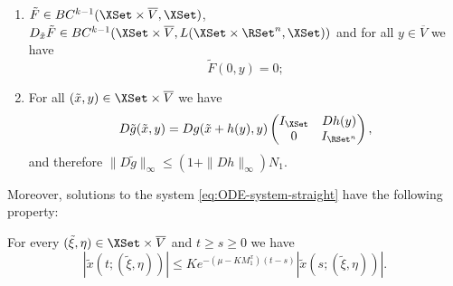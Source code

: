 \documentclass[a4paper]{siamart190516}
\begin{document}
  \begin{enumerate}
\item  $\tilde{F} \in BC^{k-1}(\XSet \times \overline{V}, \XSet)$, $D_{\tilde{x}}  \tilde{F} \in BC^{k-1}(\XSet \times \overline{V}, L(\XSet \times \RSet^n,\XSet))$ and for all $y \in \overline{V}$ we have
 \[
\tilde{F}(0,y) = 0;
 \] 
 \item  For all $(\tilde{x},y) \in \XSet \times \overline{V}$ we have
 \[
 D \tilde{g}(\tilde{x},y) = D g (\tilde{x}+h(y),y) \begin{pmatrix} I_{\XSet} & Dh(y) \\ 0 & I_{\RSet^n} \end{pmatrix},
 \]
 and therefore $\| D\tilde{g} \|_{\infty} \leq (1+\|Dh\|_{\infty}) N_1$. 
 \end{enumerate}
 \vspace{0.2cm}
 
 Moreover, solutions to the system \cref{eq:ODE-system-straight} have the following property:
 \begin{lemma}\label{lem:props-fast-sol}
For every $(\tilde{\xi},\eta) \in \XSet \times \overline{V}$ and $t \geq s \geq 0$ we have
\[
  |\tilde{x}(t;(\tilde{\xi},\eta)) | \leq K e^{-(\mu - K M^x_1) (t-s)} |\tilde{x}(s;(\tilde{\xi},\eta))|.
\]
\end{lemma}
\end{document}
